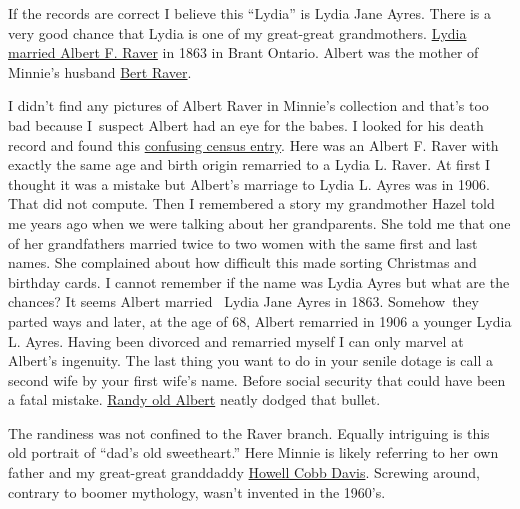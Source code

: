 If the records are correct I believe this ``Lydia'' is Lydia Jane Ayres.
There is a very good chance that Lydia is one of my great-great
grandmothers.
\href{https://familysearch.org/pal:/MM9.1.1/XLPB-DF8}{Lydia married
Albert F. Raver} in 1863 in Brant Ontario. Albert was the mother of
Minnie's husband
\href{https://familysearch.org/pal:/MM9.1.1/F3Q3-45X}{Bert Raver}.

I didn't find any pictures of Albert Raver in Minnie's collection and
that's too bad because I~suspect Albert had an eye for the babes. I
looked for his death record and found this
\href{https://familysearch.org/pal:/MM9.1.1/MVLY-WLB}{confusing census
entry}. Here was an Albert F. Raver with exactly the same age and birth
origin remarried to a Lydia L. Raver. At first I thought it was a
mistake but Albert's marriage to Lydia L. Ayres was in 1906. That did
not compute. Then I remembered a story my grandmother Hazel told me
years ago when we were talking about her grandparents. She told me that
one of her grandfathers married twice to two women with the same first
and last names. She complained about how difficult this made sorting
Christmas and birthday cards. I cannot remember if the name was Lydia
Ayres but what are the chances? It seems Albert married~ Lydia Jane
Ayres in 1863. Somehow~they parted ways and later, at the age of 68,
Albert remarried in 1906 a younger Lydia L. Ayres. Having been divorced
and remarried myself I can only marvel at Albert's ingenuity. The last
thing you want to do in your senile dotage is call a second wife by your
first wife's name. Before social security that could have been a fatal
mistake.
\href{http://www.findagrave.com/cgi-bin/fg.cgi?page=gr\&GRid=89404051}{Randy
old Albert} neatly dodged that bullet.

The randiness was not confined to the Raver branch. Equally intriguing
is this old portrait of ``dad's old sweetheart.'' Here Minnie is likely
referring to her own father and my great-great granddaddy
\href{http://www.findagrave.com/cgi-bin/fg.cgi?page=gr\&GSln=Davis\&GSfn=Howell\&GSmn=C\&GSby=1850\&GSbyrel=after\&GSdy=1950\&GSdyrel=before\&GSst=28\&GScntry=4\&GSob=n\&GRid=67837689\&df=all\&}{Howell
Cobb Davis}. Screwing around, contrary to boomer mythology, wasn't
invented in the 1960's.




